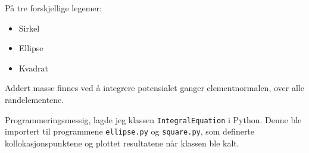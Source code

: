 På tre forskjellige legemer:
\begin{itemize}
\item Sirkel
\item Ellipse
\item Kvadrat
\end{itemize}

Addert masse finnes ved å integrere potensialet ganger elementnormalen, over alle randelementene.

\vspace{2em}
Programmeringsmessig, lagde jeg klassen \texttt{IntegralEquation} i Python.
Denne ble importert til programmene \texttt{ellipse.py} og \texttt{square.py}, som definerte kollokasjonspunktene og plottet resultatene når klassen ble kalt.
